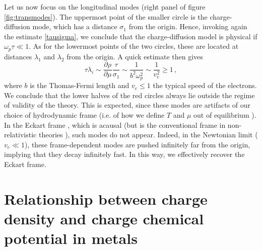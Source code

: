 \documentclass[a4paper, amsfonts, amssymb, amsmath, reprint, showkeys, nofootinbib, twoside,notitlepage]{revtex4-1}
\theoremstyle{definition}
\theoremstyle{theorem}
\begin{document}
\newpage
Let us now focus on the longitudinal modes (right panel of figure \ref{fig:transmodes}). The uppermost point of the smaller circle is the charge-diffusion mode, which has a distance $\sigma_1$ from the origin. Hence, invoking again the estimate \eqref{tausigma}, we conclude that the charge-diffusion model is physical if $\omega_p\tau \ll 1$. As for the lowermost points of the two circles, these are located at distances $\lambda_1$ and $\lambda_2$ from the origin. A quick estimate then gives
\begin{equation}
\tau \lambda_i \sim \dfrac{\partial \rho}{\partial\mu} \dfrac{\tau}{\sigma_1}\sim \dfrac{1}{b^2 \omega_p^2}\sim \dfrac{1}{v_e^2}\geq 1 \, ,
\end{equation}
where $b$ is the Thomas-Fermi length and $v_e\leq 1$ the typical speed of the electrons. We conclude that the lower halves of the red circles always lie outside the regime of validity of the theory. This is expected, since these modes are artifacts of our choice of hydrodynamic frame (i.e. of how we define $T$ and $\mu$ out of equilibrium \cite{Kovtun2019}). In the Eckart frame \cite{Eckart40}, which is acausal (but is the conventional frame in non-relativistic theories \cite[\S 26]{landau8}\cite[\S 21.C]{SommerfeldStatmech}), such modes do not appear. Indeed, in the Newtonian limit ($v_e\ll 1$), these frame-dependent modes are pushed infinitely far from the origin, implying that they decay infinitely fast. In this way, we effectively recover the Eckart frame.
\newpage
\section*{Relationship between charge density and charge chemical potential in metals}
\end{document}
